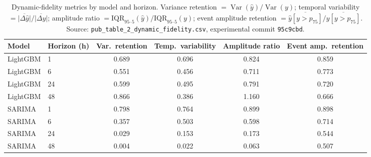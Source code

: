 \documentclass[12pt]{article}
\begin{document}
\pagestyle{empty}
\begin{table}[ht]
\centering
\caption{Dynamic-fidelity metrics by model and horizon.
Variance retention $= \operatorname{Var}(\hat{y}) / \operatorname{Var}(y)$;
temporal variability $= \overline{|\Delta\hat{y}|} / \overline{|\Delta y|}$;
amplitude ratio $= \mathrm{IQR}_{95\text{--}5}(\hat{y}) /
\mathrm{IQR}_{95\text{--}5}(y)$;
event amplitude retention $= \overline{\hat{y}[y>p_{75}]} /
\overline{y[y>p_{75}]}$.
Source: \texttt{pub\_table\_2\_dynamic\_fidelity.csv}, experimental commit
\texttt{95c9cbd}.}
\label{tab:dynamic_fidelity}
\begin{tabular}{llSSSS}
\toprule
Model & Horizon (h) &
  {Var.\ retention} &
  {Temp.\ variability} &
  {Amplitude ratio} &
  {Event amp.\ retention} \\
\midrule
LightGBM & 1  & 0.689 & 0.696 & 0.824 & 0.859 \\
LightGBM & 6  & 0.551 & 0.456 & 0.711 & 0.773 \\
LightGBM & 24 & 0.599 & 0.495 & 0.791 & 0.720 \\
LightGBM & 48 & 0.866 & 0.386 & 1.160 & 0.666 \\
\addlinespace
SARIMA   & 1  & 0.798 & 0.764 & 0.899 & 0.898 \\
SARIMA   & 6  & 0.357 & 0.503 & 0.598 & 0.714 \\
SARIMA   & 24 & 0.029 & 0.153 & 0.173 & 0.544 \\
SARIMA   & 48 & 0.004 & 0.022 & 0.063 & 0.507 \\
\bottomrule
\end{tabular}
\end{table}
\end{document}
